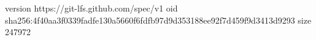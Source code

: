 version https://git-lfs.github.com/spec/v1
oid sha256:4f40aa3f0339fadfe130a5660f6fdfb97d9d353188ee92f7d459f9d3413d9293
size 247972

